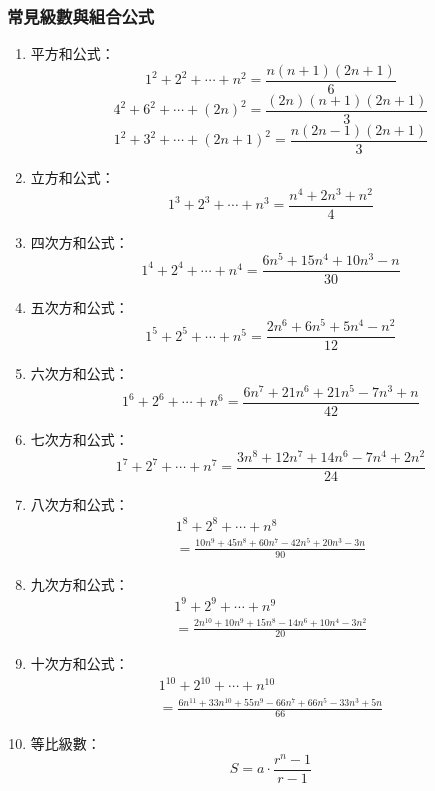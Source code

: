 \subsubsection{常見級數與組合公式}
\begin{enumerate}\itemsep = -3pt
\item 平方和公式：
\[
1^2 + 2^2 + \cdots + n^2 = \frac{n(n+1)(2n+1)}{6}
\]
\[
4^2 + 6^2 + \cdots + (2n)^2 = \frac{(2n)(n+1)(2n+1)}{3}
\]
\[
1^2 + 3^2 + \cdots + (2n+1)^2 = \frac{n(2n-1)(2n+1)}{3}
\]

\item 立方和公式：
\[
1^3 + 2^3 + \cdots + n^3 = \frac{n^4 + 2n^3 + n^2}{4}
\]

\item 四次方和公式：
\[
1^4 + 2^4 + \cdots + n^4 = \frac{6n^5 + 15n^4 + 10n^3 - n}{30}
\]

\item 五次方和公式：
\[
1^5 + 2^5 + \cdots + n^5 = \frac{2n^6 + 6n^5 + 5n^4 - n^2}{12}
\]

\item 六次方和公式：
\[
1^6 + 2^6 + \cdots + n^6 = \frac{6n^7 + 21n^6 + 21n^5 - 7n^3 + n}{42}
\]

\item 七次方和公式：
\[
1^7 + 2^7 + \cdots + n^7 = \frac{3n^8 + 12n^7 + 14n^6 - 7n^4 + 2n^2}{24}
\]	

\item 八次方和公式：
\[
\begin{aligned}
1^8 + 2^8 + \cdots + n^8 \\
= \frac{10n^9 + 45n^8 + 60n^7 - 42n^5 + 20n^3 - 3n}{90}
\end{aligned}
\]

\item 九次方和公式：
\[
\begin{aligned}
1^9 + 2^9 + \cdots + n^9 \\
= \frac{2n^{10} + 10n^9 + 15n^8 - 14n^6 + 10n^4 - 3n^2}{20}
\end{aligned}
\]

\item 十次方和公式：
\[
\begin{aligned}
1^{10} + 2^{10} + \cdots + n^{10} \\
= \frac{6n^{11} + 33n^{10} + 55n^9 - 66n^7 + 66n^5 - 33n^3 + 5n}{66}
\end{aligned}
\]

\item 等比級數：
\[
S = a \cdot \frac{r^n - 1}{r - 1}
\]


\end{enumerate}
